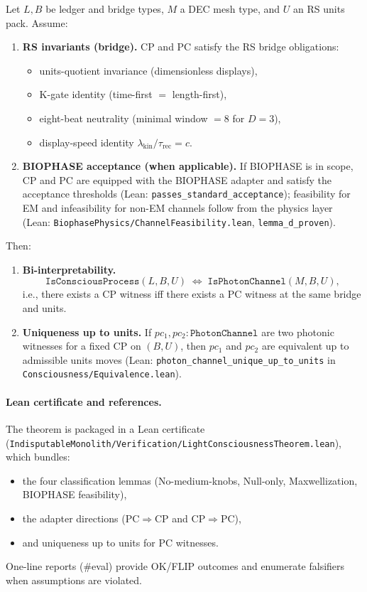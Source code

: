 \documentclass[12pt,a4paper]{article}
\begin{document}
\begin{theorem}
\label{thm:biinterp}
Let \(L,B\) be ledger and bridge types, \(M\) a DEC mesh type, and \(U\) an RS units pack. Assume:
\begin{enumerate}
  \item \textbf{RS invariants (bridge).} CP and PC satisfy the RS bridge obligations:
  \begin{itemize}
    \item units-quotient invariance (dimensionless displays),
    \item K-gate identity (time-first \(=\) length-first),
    \item eight-beat neutrality (minimal window \(=8\) for \(D=3\)),
    \item display-speed identity \(\lambda_{\mathrm{kin}}/\tau_{\mathrm{rec}}=c\).
  \end{itemize}
  \item \textbf{BIOPHASE acceptance (when applicable).} If BIOPHASE is in scope, CP and PC are equipped with the BIOPHASE adapter and satisfy the acceptance thresholds (Lean: \texttt{passes\_standard\_acceptance}); feasibility for EM and infeasibility for non-EM channels follow from the physics layer (Lean: \texttt{BiophasePhysics/ChannelFeasibility.lean}, \texttt{lemma\_d\_proven}).
\end{enumerate}
Then:
\begin{enumerate}
  \item \textbf{Bi-interpretability.} 
  \[
    \texttt{IsConsciousProcess}(L,B,U)
    \;\Longleftrightarrow\;
    \texttt{IsPhotonChannel}(M,B,U),
  \]
  i.e., there exists a CP witness iff there exists a PC witness at the same bridge and units.
  \item \textbf{Uniqueness up to units.} If \(pc_1,pc_2:\texttt{PhotonChannel}\) are two photonic witnesses for a fixed CP on \((B,U)\), then \(pc_1\) and \(pc_2\) are equivalent up to admissible units moves (Lean: \texttt{photon\_channel\_unique\_up\_to\_units} in \texttt{Consciousness/Equivalence.lean}).
\end{enumerate}
\end{theorem}

\paragraph{Lean certificate and references.}
The theorem is packaged in a Lean certificate (\texttt{IndisputableMonolith/Verification/LightConsciousnessTheorem.lean}), which bundles:
\begin{itemize}
  \item the four classification lemmas (No-medium-knobs, Null-only, Maxwellization, BIOPHASE feasibility),
  \item the adapter directions (PC\(\Rightarrow\)CP and CP\(\Rightarrow\)PC),
  \item and uniqueness up to units for PC witnesses.
\end{itemize}
One-line reports (\#eval) provide OK/FLIP outcomes and enumerate falsifiers when assumptions are violated.
\end{document}
